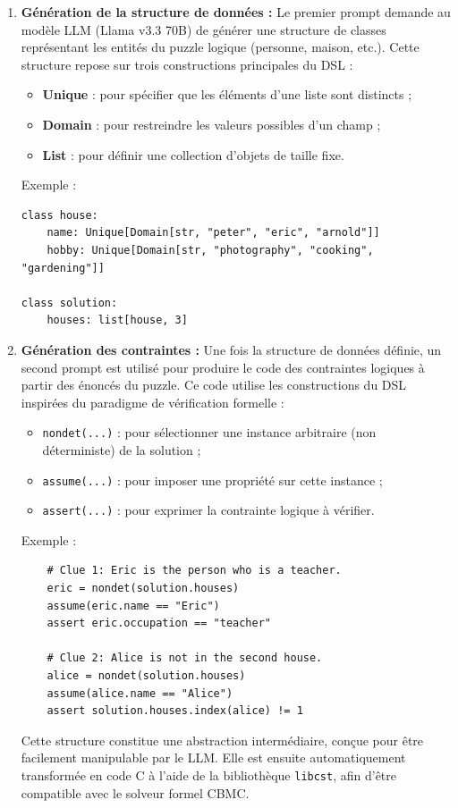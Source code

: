 \documentclass[a4paper,11pt]{article}
\begin{document}
\begin{enumerate}
    \item \textbf{Génération de la structure de données :}  
    Le premier prompt demande au modèle LLM (Llama v3.3 70B) de générer une structure de classes représentant les entités du puzzle logique (personne, maison, etc.). Cette structure repose sur trois constructions principales du DSL :
    \begin{itemize}
        \item \textbf{Unique} : pour spécifier que les éléments d'une liste sont distincts ;
        \item \textbf{Domain} : pour restreindre les valeurs possibles d'un champ ;
        \item \textbf{List} : pour définir une collection d'objets de taille fixe.
    \end{itemize}
    Exemple :
\begin{verbatim}
class house:
    name: Unique[Domain[str, "peter", "eric", "arnold"]]
    hobby: Unique[Domain[str, "photography", "cooking", "gardening"]]

class solution:
    houses: list[house, 3]
\end{verbatim}

    \item \textbf{Génération des contraintes :}  
    Une fois la structure de données définie, un second prompt est utilisé pour produire le code des contraintes logiques à partir des énoncés du puzzle. Ce code utilise les constructions du DSL inspirées du paradigme de vérification formelle :
    \begin{itemize}
        \item \texttt{nondet(...)} : pour sélectionner une instance arbitraire (non déterministe) de la solution ;
        \item \texttt{assume(...)} : pour imposer une propriété sur cette instance ;
        \item \texttt{assert(...)} : pour exprimer la contrainte logique à vérifier.
    \end{itemize}
    Exemple :
\begin{verbatim}
    # Clue 1: Eric is the person who is a teacher.
    eric = nondet(solution.houses)
    assume(eric.name == "Eric")
    assert eric.occupation == "teacher"
    
    # Clue 2: Alice is not in the second house.
    alice = nondet(solution.houses)
    assume(alice.name == "Alice")
    assert solution.houses.index(alice) != 1
\end{verbatim}
Cette structure constitue une abstraction intermédiaire, conçue pour être facilement manipulable par le LLM. Elle est ensuite automatiquement transformée en code C à l’aide de la bibliothèque \texttt{libcst}, afin d’être compatible avec le solveur formel CBMC.



\end{enumerate}
\end{document}
